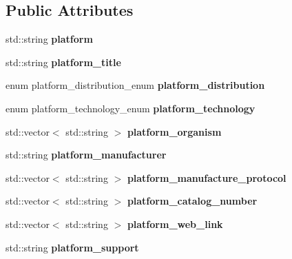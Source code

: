 \subsection*{Public Attributes}
\begin{DoxyCompactItemize}
\item 
\mbox{\label{structGeoSoft_a2c3a9073415ffd2788c0cc9db64ec1ea}} 
std\+::string {\bfseries platform}
\item 
\mbox{\label{structGeoSoft_ab4b8ef36843e6eddbf11e705a89b5c71}} 
std\+::string {\bfseries platform\+\_\+title}
\item 
\mbox{\label{structGeoSoft_a6ecae76c8f3699f41c13d1bc355813f9}} 
enum platform\+\_\+distribution\+\_\+enum {\bfseries platform\+\_\+distribution}
\item 
\mbox{\label{structGeoSoft_aabc64301a99f64e66dd510c256d68dac}} 
enum platform\+\_\+technology\+\_\+enum {\bfseries platform\+\_\+technology}
\item 
\mbox{\label{structGeoSoft_af6d445dc03c134cb7ce6644ef6f39664}} 
std\+::vector$<$ std\+::string $>$ {\bfseries platform\+\_\+organism}
\item 
\mbox{\label{structGeoSoft_a7cf57fc715a1fb320ba1bda6c5181a3d}} 
std\+::string {\bfseries platform\+\_\+manufacturer}
\item 
\mbox{\label{structGeoSoft_a83ffef776fae057106e37af6c3e7062e}} 
std\+::vector$<$ std\+::string $>$ {\bfseries platform\+\_\+manufacture\+\_\+protocol}
\item 
\mbox{\label{structGeoSoft_a2fca553de5ade9575c43c12b62cf478d}} 
std\+::vector$<$ std\+::string $>$ {\bfseries platform\+\_\+catalog\+\_\+number}
\item 
\mbox{\label{structGeoSoft_ad4e92e7eaca82851a9b98d8cb2badbf5}} 
std\+::vector$<$ std\+::string $>$ {\bfseries platform\+\_\+web\+\_\+link}
\item 
\mbox{\label{structGeoSoft_a3dc1c04870947c75e881d82c108dbfe0}} 
std\+::string {\bfseries platform\+\_\+support}

\end{DoxyCompactItemize}
